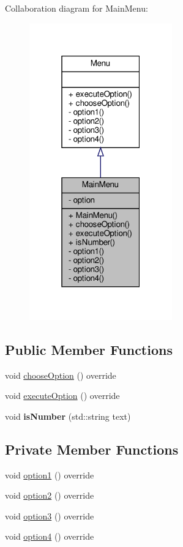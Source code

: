 Collaboration diagram for Main\+Menu\+:
\nopagebreak
\begin{figure}[H]
\begin{center}
\leavevmode
\includegraphics[width=175pt]{classMainMenu__coll__graph}
\end{center}
\end{figure}
\subsection*{Public Member Functions}
\begin{DoxyCompactItemize}
\item 
void \hyperlink{classMainMenu_a21c41131a13a5149fe5859d1d670e20b}{choose\+Option} () override
\item 
void \hyperlink{classMainMenu_adfc425f06cd51c10d78521315ae9abd6}{execute\+Option} () override
\item 
\mbox{\label{classMainMenu_a8d9cc89fce7c6c8e1ec838d594add0b8}} 
void {\bfseries is\+Number} (std\+::string text)
\end{DoxyCompactItemize}
\subsection*{Private Member Functions}
\begin{DoxyCompactItemize}
\item 
void \hyperlink{classMainMenu_a783930d91ab415468d9c631eb61d0a00}{option1} () override
\item 
void \hyperlink{classMainMenu_a17f6460d8872b2ca269ebcf6eaa82589}{option2} () override
\item 
void \hyperlink{classMainMenu_a97fe096cec584b02614f759d7fcef8d1}{option3} () override
\item 
void \hyperlink{classMainMenu_a2097f6d1d30bad0b5c6e28575a48cc3e}{option4} () override
\end{DoxyCompactItemize}
